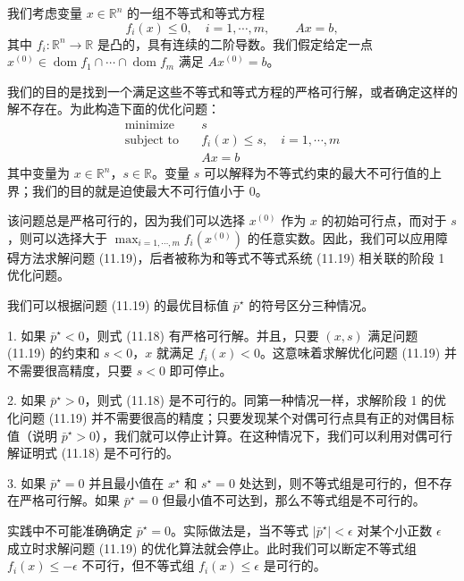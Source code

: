 \documentclass[UTF8, 12pt, fontset=fandol, oneside]{ctexart}
\begin{document}
我们考虑变量 $x\in\mathbb{R}^n$ 的一组不等式和等式方程
\begin{equation}
f_i(x)\leq 0,\quad i=1,\cdots,m,\qquad Ax=b,
\tag{11.18}
\end{equation}
其中 $f_i:\mathbb{R}^n\to\mathbb{R}$ 是凸的，具有连续的二阶导数。我们假定给定一点 $x^{(0)}\in\operatorname{dom} f_1\cap\cdots\cap\operatorname{dom} f_m$ 满足 $Ax^{(0)}=b$。

我们的目的是找到一个满足这些不等式和等式方程的严格可行解，或者确定这样的解不存在。为此构造下面的优化问题：
\begin{equation}
\begin{aligned}
\text{minimize}\quad & s\\
\text{subject to}\quad & f_i(x)\leq s,\quad i=1,\cdots,m\\
& Ax=b
\end{aligned}
\tag{11.19}
\end{equation}
其中变量为 $x\in\mathbb{R}^n$，$s\in\mathbb{R}$。变量 $s$ 可以解释为不等式约束的最大不可行值的上界；我们的目的就是迫使最大不可行值小于 0。

该问题总是严格可行的，因为我们可以选择 $x^{(0)}$ 作为 $x$ 的初始可行点，而对于 $s$，则可以选择大于 $\max_{i=1,\cdots,m}f_i(x^{(0)})$ 的任意实数。因此，我们可以应用障碍方法求解问题 (11.19)，后者被称为和等式不等式系统 (11.19) 相关联的阶段 1 优化问题。

我们可以根据问题 (11.19) 的最优目标值 $\bar{p}^\star$ 的符号区分三种情况。

1. 如果 $\bar{p}^\star<0$，则式 (11.18) 有严格可行解。并且，只要 $(x,s)$ 满足问题 (11.19) 的约束和 $s<0$，$x$ 就满足 $f_i(x)<0$。这意味着求解优化问题 (11.19) 并不需要很高精度，只要 $s<0$ 即可停止。

2. 如果 $\bar{p}^\star>0$，则式 (11.18) 是不可行的。同第一种情况一样，求解阶段 1 的优化问题 (11.19) 并不需要很高的精度；只要发现某个对偶可行点具有正的对偶目标值（说明 $\bar{p}^\star>0$），我们就可以停止计算。在这种情况下，我们可以利用对偶可行解证明式 (11.18) 是不可行的。

3. 如果 $\bar{p}^\star=0$ 并且最小值在 $x^\star$ 和 $s^\star=0$ 处达到，则不等式组是可行的，但不存在严格可行解。如果 $\bar{p}^\star=0$ 但最小值不可达到，那么不等式组是不可行的。

实践中不可能准确确定 $\bar{p}^\star=0$。实际做法是，当不等式 $|\bar{p}^\star|<\epsilon$ 对某个小正数 $\epsilon$ 成立时求解问题 (11.19) 的优化算法就会停止。此时我们可以断定不等式组 $f_i(x)\leq -\epsilon$ 不可行，但不等式组 $f_i(x)\leq \epsilon$ 是可行的。
\end{document}
